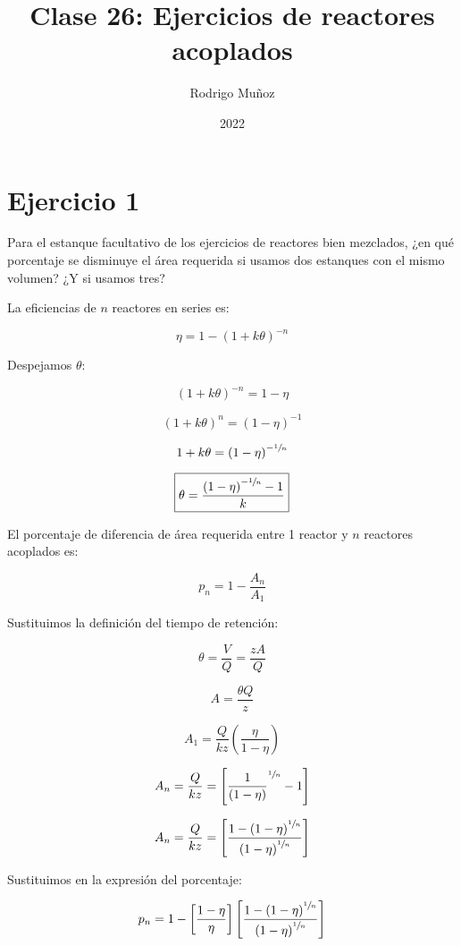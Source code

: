 \documentclass[11pt]{article}
\title{Clase 26: Ejercicios de reactores acoplados}
\author{Rodrigo Muñoz}
\date{2022}
\begin{document}
\maketitle

\section{Ejercicio 1}

Para el estanque facultativo de los ejercicios de reactores bien mezclados, ¿en qué porcentaje se disminuye el área requerida si usamos dos estanques con el mismo volumen? ¿Y si usamos tres?

\bigskip \bigskip

La eficiencias de \( n \) reactores en series es:

\[ \eta = 1 - \left( 1 + k \theta \right) ^ {-n} \]

Despejamos \( \theta \):

\[ \left( 1 + k \theta \right) ^ {-n} = 1 - \eta \]

\[ \left( 1 + k \theta \right) ^ n = \left( 1 - \eta \right) ^ {-1} \]

\[ 1 + k \theta = \left( 1 - \eta \right) ^ { - \sfrac{1}{n} } \]

\[ \boxed{ \theta = \frac{ \left( 1 - \eta \right) ^ { - \sfrac{1}{n} } - 1 }{ k } } \]

El porcentaje de diferencia de área requerida entre 1 reactor y \( n \) reactores acoplados es:

\[ p_n = 1 - \frac{A_n}{A_1} \]

Sustituimos la definición del tiempo de retención:

\[ \theta = \frac{V}{Q} = \frac{ z A }{Q} \]

\[ A = \frac{ \theta Q }{z} \]

\[ A_1 = \frac{Q}{ k z } \left( \frac{ \eta }{ 1 - \eta } \right) \]

\[ A_n = \frac{Q}{ k z } = \left[ \frac{1}{ \left( 1 - \eta \right) } ^ { \sfrac{1}{n} } - 1 \right] \]

\[ A_n = \frac{Q}{ k z } = \left[ \frac{ 1 - \left( 1 - \eta \right) ^ { \sfrac{1}{n} } }{ \left( 1 - \eta \right)  ^ { \sfrac{1}{n} } } \right] \]

Sustituimos en la expresión del porcentaje:

\[ p_n = 1 - \left[ \frac{ 1 - \eta }{ \eta } \right] \left[ \frac{ 1 - \left( 1 - \eta \right) ^ { \sfrac{1}{n} } }{ \left( 1 - \eta \right)  ^ { \sfrac{1}{n} } } \right] \]
\end{document}
